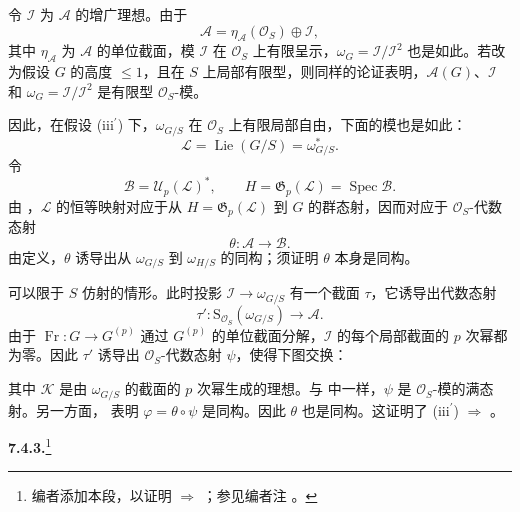 令 \(\mathcal I\) 为 \(\mathcal A\) 的增广理想。由于
\[
  \mathcal A
  =
  \eta_{\mathcal A}(\mathcal O_S)\oplus\mathcal I,
\]
其中 \(\eta_{\mathcal A}\) 为 \(\mathcal A\) 的单位截面，模 \(\mathcal I\) 在 \(\mathcal O_S\) 上有限呈示，\(\omega_G=\mathcal I/\mathcal I^2\) 也是如此。若改为假设 \(G\) 的高度 \(\leq1\)，且在 \(S\) 上局部有限型，则同样的论证表明，\(\mathcal A(G)\)、\(\mathcal I\) 和 \(\omega_G=\mathcal I/\mathcal I^2\) 是有限型 \(\mathcal O_S\)-模。

因此，在假设 (iii\(^{\prime}\)) 下，\(\omega_{G/S}\) 在 \(\mathcal O_S\) 上有限局部自由，下面的模也是如此：
\[
  \mathcal L
  =
  \operatorname{Lie}(G/S)
  =
  \omega_{G/S}^{*}.
\]
令
\[
  \mathcal B=\mathcal U_p(\mathcal L)^{*},
  \qquad
  H=\mathfrak G_p(\mathcal L)=\operatorname{Spec}\mathcal B.
\]
由 ，\(\mathcal L\) 的恒等映射对应于从 \(H=\mathfrak G_p(\mathcal L)\) 到 \(G\) 的群态射，因而对应于 \(\mathcal O_S\)-代数态射
\[
  \theta:\mathcal A\longrightarrow\mathcal B.
\]
由定义，\(\theta\) 诱导出从 \(\omega_{G/S}\) 到 \(\omega_{H/S}\) 的同构；须证明 \(\theta\) 本身是同构。

可以限于 \(S\) 仿射的情形。此时投影 \(\mathcal I\to\omega_{G/S}\) 有一个截面 \(\tau\)，它诱导出代数态射
\[
  \tau':
  \mathrm S_{\mathcal O_S}(\omega_{G/S})
  \longrightarrow
  \mathcal A.
\]
由于 \(\operatorname{Fr}:G\to G^{(p)}\) 通过 \(G^{(p)}\) 的单位截面分解，\(\mathcal I\) 的每个局部截面的 \(p\) 次幂都为零。因此 \(\tau'\) 诱导出 \(\mathcal O_S\)-代数态射 \(\psi\)，使得下图交换：
\begin{center}
  \label{sga3:VIIA:7.4.2-height-one-characterization-triangle}
  
\end{center}
其中 \(\mathcal K\) 是由 \(\omega_{G/S}\) 的截面的 \(p\) 次幂生成的理想。与  中一样，\(\psi\) 是 \(\mathcal O_S\)-模的满态射。另一方面， 表明 \(\varphi=\theta\circ\psi\) 是同构。因此 \(\theta\) 也是同构。这证明了 (iii\(^{\prime}\)) \(\Rightarrow\) 。

\medskip
\noindent\textbf{7.4.3.}\footnote{编者添加本段，以证明  \(\Rightarrow\) ；参见编者注 。}
\label{sga3:VIIA:7.4.3}

